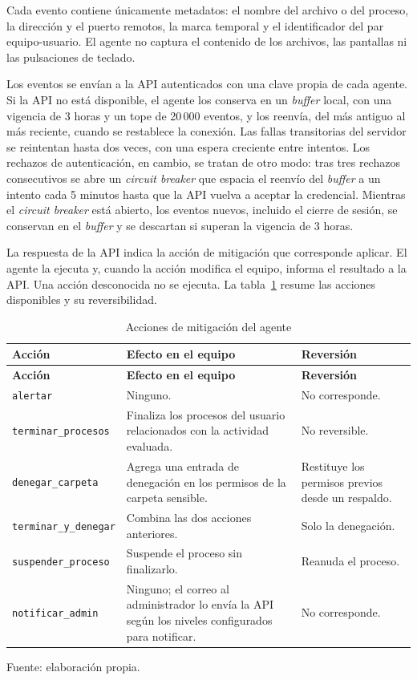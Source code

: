 Cada evento contiene únicamente metadatos: el nombre del archivo o del proceso, la dirección y el puerto remotos, la marca temporal y el identificador del par equipo-usuario. El agente no captura el contenido de los archivos, las pantallas ni las pulsaciones de teclado.

Los eventos se envían a la API autenticados con una clave propia de cada agente. Si la API no está disponible, el agente los conserva en un \emph{buffer} local, con una vigencia de 3 horas y un tope de 20\,000 eventos, y los reenvía, del más antiguo al más reciente, cuando se restablece la conexión. Las fallas transitorias del servidor se reintentan hasta dos veces, con una espera creciente entre intentos. Los rechazos de autenticación, en cambio, se tratan de otro modo: tras tres rechazos consecutivos se abre un \emph{circuit breaker} que espacia el reenvío del \emph{buffer} a un intento cada 5 minutos hasta que la API vuelva a aceptar la credencial. Mientras el \emph{circuit breaker} está abierto, los eventos nuevos, incluido el cierre de sesión, se conservan en el \emph{buffer} y se descartan si superan la vigencia de 3 horas.

La respuesta de la API indica la acción de mitigación que corresponde aplicar. El agente la ejecuta y, cuando la acción modifica el equipo, informa el resultado a la API. Una acción desconocida no se ejecuta. La tabla~\ref{tab:acciones-agente} resume las acciones disponibles y su reversibilidad.

\begin{longtable}{>{\raggedright\arraybackslash}p{4.1cm}>{\raggedright\arraybackslash}p{5.9cm}>{\raggedright\arraybackslash}p{4.1cm}}
	\caption{Acciones de mitigación del agente}
	\label{tab:acciones-agente}\\
	\hline
	\textbf{Acción} & \textbf{Efecto en el equipo} & \textbf{Reversión} \\
	\hline
	\endfirsthead
	\hline
	\textbf{Acción} & \textbf{Efecto en el equipo} & \textbf{Reversión} \\
	\hline
	\endhead
	\texttt{alertar} & Ninguno. & No corresponde. \\
	\hline
	\texttt{terminar\_procesos} & Finaliza los procesos del usuario relacionados con la actividad evaluada. & No reversible. \\
	\hline
	\texttt{denegar\_carpeta} & Agrega una entrada de denegación en los permisos de la carpeta sensible. & Restituye los permisos previos desde un respaldo. \\
	\hline
	\texttt{terminar\_y\_denegar} & Combina las dos acciones anteriores. & Solo la denegación. \\
	\hline
	\texttt{suspender\_proceso} & Suspende el proceso sin finalizarlo. & Reanuda el proceso. \\
	\hline
	\texttt{notificar\_admin} & Ninguno; el correo al administrador lo envía la API según los niveles configurados para notificar. & No corresponde. \\
	\hline
\end{longtable}
{\small Fuente: elaboración propia.\par}


